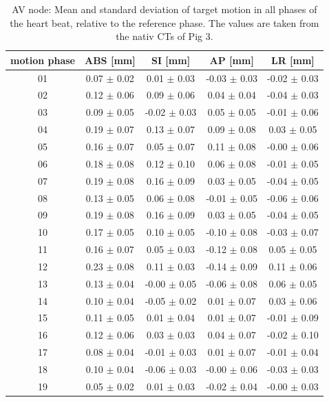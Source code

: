 \documentclass[type=dr, dr=rernat, accentcolor=tud7b,colorbacktitle, bigchapter, openright, twoside, 12pt ]{tudthesis}
\begin{document}
\newpage

\begin{table}[htbp]
  \centering
  \caption{AV node: Mean and standard deviation of target motion in all phases of the heart beat, relative to the reference phase. The values are 
  taken from the nativ CTs of Pig 3.}
  \begin{tabular}{|c|c|c|c|c|}
    \hline\hline
    motion phase\rule{0pt}{2.6ex}\rule[-1.2ex]{0pt}{0pt} & ABS [mm] & SI [mm] & AP [mm] & LR [mm]\\
    \hline
01&0.07 $\pm$ 0.02 &0.01 $\pm$ 0.03 &-0.03 $\pm$ 0.03 &-0.02 $\pm$ 0.03 \\
02&0.12 $\pm$ 0.06 &0.09 $\pm$ 0.06 &0.04 $\pm$ 0.04 &-0.04 $\pm$ 0.03 \\
03&0.09 $\pm$ 0.05 &-0.02 $\pm$ 0.03 &0.05 $\pm$ 0.05 &-0.01 $\pm$ 0.06 \\
04&0.19 $\pm$ 0.07 &0.13 $\pm$ 0.07 &0.09 $\pm$ 0.08 &0.03 $\pm$ 0.05 \\
05&0.16 $\pm$ 0.07 &0.05 $\pm$ 0.07 &0.11 $\pm$ 0.08 &-0.00 $\pm$ 0.06 \\
06&0.18 $\pm$ 0.08 &0.12 $\pm$ 0.10 &0.06 $\pm$ 0.08 &-0.01 $\pm$ 0.05 \\
07&0.19 $\pm$ 0.08 &0.16 $\pm$ 0.09 &0.03 $\pm$ 0.05 &-0.04 $\pm$ 0.05 \\
08&0.13 $\pm$ 0.05 &0.06 $\pm$ 0.08 &-0.01 $\pm$ 0.05 &-0.06 $\pm$ 0.06 \\
09&0.19 $\pm$ 0.08 &0.16 $\pm$ 0.09 &0.03 $\pm$ 0.05 &-0.04 $\pm$ 0.05 \\
10&0.17 $\pm$ 0.05 &0.10 $\pm$ 0.05 &-0.10 $\pm$ 0.08 &-0.03 $\pm$ 0.07 \\
11&0.16 $\pm$ 0.07 &0.05 $\pm$ 0.03 &-0.12 $\pm$ 0.08 &0.05 $\pm$ 0.05 \\
12&0.23 $\pm$ 0.08 &0.11 $\pm$ 0.03 &-0.14 $\pm$ 0.09 &0.11 $\pm$ 0.06 \\
13&0.13 $\pm$ 0.04 &-0.00 $\pm$ 0.05 &-0.06 $\pm$ 0.08 &0.06 $\pm$ 0.05 \\
14&0.10 $\pm$ 0.04 &-0.05 $\pm$ 0.02 &0.01 $\pm$ 0.07 &0.03 $\pm$ 0.06 \\
15&0.11 $\pm$ 0.05 &0.01 $\pm$ 0.04 &0.01 $\pm$ 0.07 &-0.01 $\pm$ 0.09 \\ 
16&0.12 $\pm$ 0.06 &0.03 $\pm$ 0.03 &0.04 $\pm$ 0.07 &-0.02 $\pm$ 0.10 \\
17&0.08 $\pm$ 0.04 &-0.01 $\pm$ 0.03 &0.01 $\pm$ 0.07 &-0.01 $\pm$ 0.04 \\
18&0.10 $\pm$ 0.04 &-0.06 $\pm$ 0.03 &-0.00 $\pm$ 0.06 &-0.03 $\pm$ 0.03 \\
19&0.05 $\pm$ 0.02 &0.01 $\pm$ 0.03 &-0.02 $\pm$ 0.04 &-0.00 $\pm$ 0.03 \\
    \hline\hline
  \end{tabular}
  \label{tab:motion:nativ:AV:Pig3}
\end{table}
\end{document}
